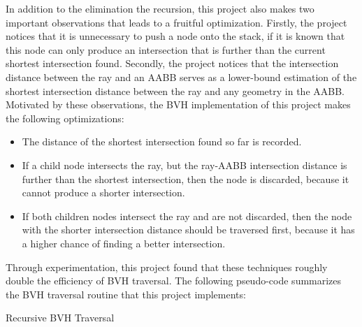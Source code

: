 In addition to the elimination the recursion, this project also makes two important observations that leads to a fruitful optimization. Firstly, the project notices that it is unnecessary to push a node onto the stack, if it is known that this node can only produce an intersection that is further than the current shortest intersection found. Secondly, the project notices that the intersection distance between the ray and an AABB serves as a lower-bound estimation of the shortest intersection distance between the ray and any geometry in the AABB. Motivated by these observations, the BVH implementation of this project makes the following optimizations:
\begin{itemize}
    \item The distance of the shortest intersection found so far is recorded.
    \item If a child node intersects the ray, but the ray-AABB intersection distance is further than the shortest intersection, then the node is discarded, because it cannot produce a shorter intersection.
    \item If both children nodes intersect the ray and are not discarded, then the node with the shorter intersection distance should be traversed first, because it has a higher chance of finding a better intersection.
\end{itemize}
Through experimentation, this project found that these techniques roughly double the efficiency of BVH traversal. The following pseudo-code summarizes the BVH traversal routine that this project implements:

\begin{algorithm}[H]
    \label{algo bvh traversal}
    \caption{Recursive BVH Traversal}
\end{algorithm} 

